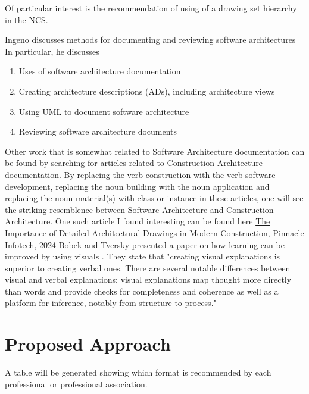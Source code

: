 \documentclass{acm_proc_article-sp}
\begin{document}
Of particular interest is the recommendation of using of a drawing set hierarchy in the NCS.  

Ingeno discusses methods for documenting and reviewing software architectures \cite{Lamport:SoftwareArchitectureHandbook} In particular, he discusses
\begin{enumerate}
	\item Uses of software architecture documentation
	\item Creating architecture descriptions (ADs), including architecture views
	\item Using UML to document software architecture
	\item Reviewing software architecture documents
\end{enumerate}

Other work that is somewhat related to Software Architecture documentation can be found by searching for articles related to Construction Architecture documentation. By replacing the verb construction with the verb software development, replacing the noun building with the noun application and replacing the noun material(s) with class or instance in these articles, one will see the striking resemblence between Software Architecture and Construction Architecture. One such article I found interesting can be found here
\href{https://pinnacleinfotech.com/importance-of-detailed-architectural-drawings-in-modern-construction/}{The Importance of Detailed Architectural Drawings in Modern Construction, Pinnacle Infotech, 2024}
\newline
\newline
Bobek and Tversky presented a paper on how learning can be improved by using visuals \cite{Lamport:VisualExplanations}. They state that "creating visual explanations is superior to creating verbal ones. There are several notable differences between visual and verbal explanations; visual explanations map thought more directly than words and provide checks for completeness and coherence as well as a platform for inference, notably from structure to process." \cite{Lamport:VisualExplanations}

\section{Proposed Approach}
A table will be generated showing which format is recommended by each professional or professional association.
\end{document}

